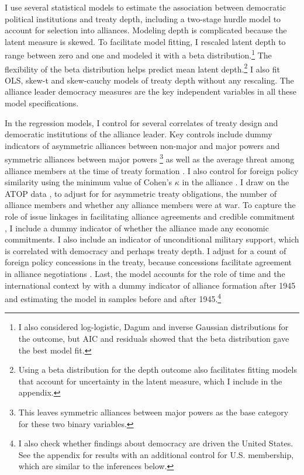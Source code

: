 \documentclass[12pt]{article}
\begin{document}
I use several statistical models to estimate the association between democratic political institutions and treaty depth, including a two-stage hurdle model to account for selection into alliances. 
Modeling depth is complicated because the latent measure is skewed.
To facilitate model fitting, I rescaled latent depth to range between zero and one and modeled it with a beta distribution.\footnote{I also considered log-logistic, Dagum and inverse Gaussian distributions for the outcome, but AIC and residuals showed that the beta distribution gave the best model fit.}
The flexibility of the beta distribution helps predict mean latent depth.\footnote{Using a beta distribution for the depth outcome also facilitates fitting models that account for uncertainty in the latent measure, which I include in the appendix.} 
I also fit OLS, skew-t and skew-cauchy models of treaty depth without any rescaling.
The alliance leader democracy measures are the key independent variables in all these model specifications. 


In the regression models, I control for several correlates of treaty design and democratic institutions of the alliance leader. 
Key controls include dummy indicators of asymmetric alliances between non-major and major powers and symmetric alliances between major powers \citep{Mattes2012}\footnote{This leaves symmetric alliances between major powers as the base category for these two binary variables.} as well as the average threat among alliance members at the time of treaty formation \citep{LeedsSavun2007}. 
I also control for foreign policy similarity using the minimum value of Cohen's $\kappa$ in the alliance \citep{Hage2011}.
I draw on the ATOP data \citep{Leedsetal2002}, to adjust for for asymmetric treaty obligations, the number of alliance members and whether any alliance members were at war. 
To capture the role of issue linkages in facilitating alliance agreements and credible commitment \citep{Poast2012, Poast2013}, I include a dummy indicator of whether the alliance made any economic commitments. 
I also include an indicator of unconditional military support, which is correlated with democracy \citep{Chibaetal2015} and perhaps treaty depth. 
I adjust for a count of foreign policy concessions in the treaty, because concessions facilitate agreement in alliance negotiations \citep{Johnson2015}. 
Last, the model accounts for the role of time and the international context by with a dummy indicator of alliance formation after 1945 and estimating the model in samples before and after 1945.\footnote{I also check whether findings about democracy are driven the United States. See the appendix for results with an additional control for U.S. membership, which are similar to the inferences below.}
\end{document}
